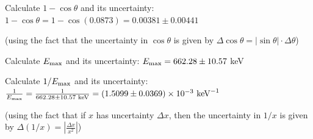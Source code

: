 Calculate $1 - \cos\theta$ and its uncertainty:
$1 - \cos\theta = 1 - \cos(0.0873) = 0.00381 \pm 0.00441$

(using the fact that the uncertainty in $\cos\theta$ is given by $\Delta\cos\theta = |\sin\theta|\cdot\Delta\theta$)

Calculate $E_{\rm max}$ and its uncertainty:
$E_{\rm max} = 662.28 \pm 10.57$ keV

Calculate $1/E_{\rm max}$ and its uncertainty:
$\frac{1}{E_{\rm max}} = \frac{1}{662.28 \pm 10.57 \text{ keV}} = (1.5099 \pm 0.0369)\times10^{-3}\text{ keV}^{-1}$

(using the fact that if $x$ has uncertainty $\Delta x$, then the uncertainty in $1/x$ is given by $\Delta(1/x) = |\frac{\Delta x}{x^2}|$)
